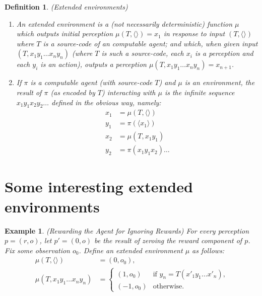 \documentclass{article}
\newtheorem{myexample}[mytheorem]{Example}
\newtheorem{mydefinition}[mytheorem]{Definition}
\begin{document}
\begin{mydefinition}
\label{extendedenvironmentsdefn}
(Extended environments)
\begin{enumerate}
  \item
  An \emph{extended environment} is a (not necessarily deterministic)
  function $\mu$ which outputs initial perception $\mu(T,\langle\rangle)=x_1$
  in response to input $(T,\langle\rangle)$ where $T$ is a source-code of an
  computable agent; and which, when given input $(T,x_1y_1\ldots x_ny_n)$ (where
  $T$ is such a source-code, each $x_i$ is a perception and each $y_i$ is
  an action), outputs a perception $\mu(T,x_1y_1\ldots x_ny_n)=x_{n+1}$.
  \item
  If $\pi$ is a computable agent (with source-code $T$)
  and $\mu$ is an environment, the \emph{result of $\pi$ (as encoded by $T$)
  interacting with $\mu$} is the infinite sequence $x_1y_1x_2y_2\ldots$ defined in
  the obvious way, namely:
  \begin{align*}
    x_1 &= \mu(T,\langle\rangle)\\
    y_1 &= \pi(\langle x_1\rangle)\\
    x_2 &= \mu(T,x_1y_1)\\
    y_2 &= \pi(x_1y_1x_2) \ldots
  \end{align*}
\end{enumerate}
\end{mydefinition}

\section{Some interesting extended environments}
\label{examplesection}

\begin{myexample}
\label{rewardagentforignoringrewardsexample}
  (Rewarding the Agent for Ignoring Rewards)
  For every perception $p=(r,o)$, let $p'=(0,o)$ be the result of zeroing the
  reward component of $p$.
  Fix some observation $o_0$.
  Define an extended environment $\mu$ as follows:
  \begin{align*}
    \mu(T,\langle\rangle) &= (0,o_0),\\
    \mu(T,x_1y_1\ldots x_ny_n) &=
      \begin{cases}
        (1,o_0) & \mbox{if $y_n=T(x'_1y_1\ldots x'_n)$,}\\
        (-1,o_0) & \mbox{otherwise.}
      \end{cases}
  \end{align*}
\end{myexample}
\end{document}
